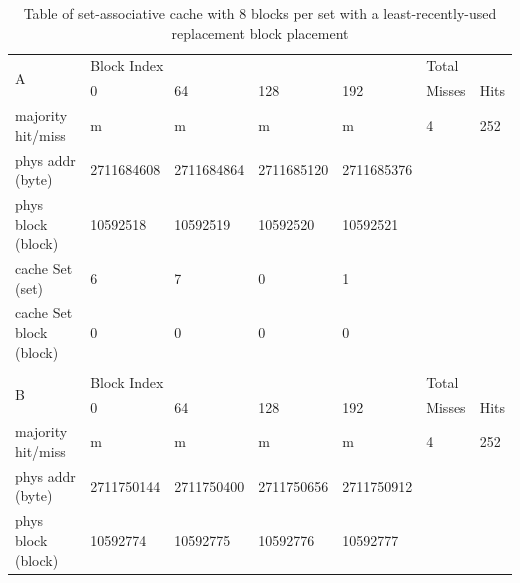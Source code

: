 \documentclass[12pt]{article}
\begin{document}
\begin{table}[H]
\centering
\caption{Table of set-associative cache with 8 blocks per set with a least-recently-used replacement block placement}
\begin{tabular}{lllllll}
\multicolumn{1}{l|}{\multirow{2}{*}{A}}      & \multicolumn{4}{l|}{Block Index}                                       & \multicolumn{2}{l}{Total} \\
\multicolumn{1}{l|}{}                        & 0          & 64         & 128        & \multicolumn{1}{l|}{192}        & Misses        & Hits       \\ \cline{1-6}
\multicolumn{1}{l|}{majority hit/miss}       & m          & m          & m          & \multicolumn{1}{l|}{m}          & 4             & 252        \\
\multicolumn{1}{l|}{phys addr (byte)}        & 2711684608 & 2711684864 & 2711685120 & \multicolumn{1}{l|}{2711685376} &               &            \\
\multicolumn{1}{l|}{phys block (block)}      & 10592518   & 10592519   & 10592520   & \multicolumn{1}{l|}{10592521}   &               &            \\
\multicolumn{1}{l|}{cache Set (set)}         & 6          & 7          & 0          & \multicolumn{1}{l|}{1}          &               &            \\
\multicolumn{1}{l|}{cache Set block (block)} & 0          & 0          & 0          & \multicolumn{1}{l|}{0}          &               &            \\
                                             &            &            &            &                                 &               &            \\
\multicolumn{1}{l|}{\multirow{2}{*}{B}}      & \multicolumn{4}{l|}{Block Index}                                       & \multicolumn{2}{l}{Total} \\
\multicolumn{1}{l|}{}                        & 0          & 64         & 128        & \multicolumn{1}{l|}{192}        & Misses        & Hits       \\ \hline
\multicolumn{1}{l|}{majority hit/miss}       & m          & m          & m          & \multicolumn{1}{l|}{m}          & 4             & 252        \\
\multicolumn{1}{l|}{phys addr (byte)}        & 2711750144 & 2711750400 & 2711750656 & \multicolumn{1}{l|}{2711750912} &               &            \\
\multicolumn{1}{l|}{phys block (block)}      & 10592774   & 10592775   & 10592776   & \multicolumn{1}{l|}{10592777}   &               &            \\

\end{tabular}
\end{table}
\end{document}
